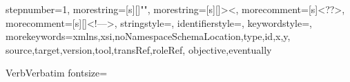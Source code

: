 {
    stepnumber=1,
    morestring=[s][\color{mauve}]{"}{"},
    morestring=[s][\color{black}]{>}{<},
    morecomment=[s]{<?}{?>},
    morecomment=[s][\color{dkgreen}]{<!--}{-->},
    stringstyle=\color{black},
    identifierstyle=\color{lightblue},
    keywordstyle=\color{red},
    morekeywords={xmlns,xsi,noNamespaceSchemaLocation,type,id,x,y,%
    source,target,version,tool,transRef,roleRef,%
    objective,eventually}%
}

\makeatletter
\newenvironment{SmallListing}[1][]
{\lstset{#1}\VerbatimEnvironment\begin{VerbatimOut}{VerbEnv.tmp}}
{\end{VerbatimOut}\settowidth\@tempdima{%
        }
    \minipage{\@tempdima}\endminipage}
\makeatother

\DefineVerbatimEnvironment%
{Verb}{Verbatim}
{fontsize=\fontsize{12pt}{14pt}\selectfont}


\renewcommand{\lstlistingname}{Листинг}

\makeatletter
\AtBeginDocument{%
    \let\c@ListingEnv\c@lstlisting
    \let\theListingEnv\thelstlisting
    \let\ftype@lstlisting\ftype@ListingEnv %
}
\makeatother

\newcommand{\cpp}{%
    C\nolinebreak\hspace{-.05em}%
    \raisebox{.2ex}{+}\nolinebreak\hspace{-.10em}%
    \raisebox{.2ex}{+}%
}

\newcommand\altshape{\ifnumodd{\value{rowcnt}}{\color{red}}{\vspace*{-1ex}\itshape}}

